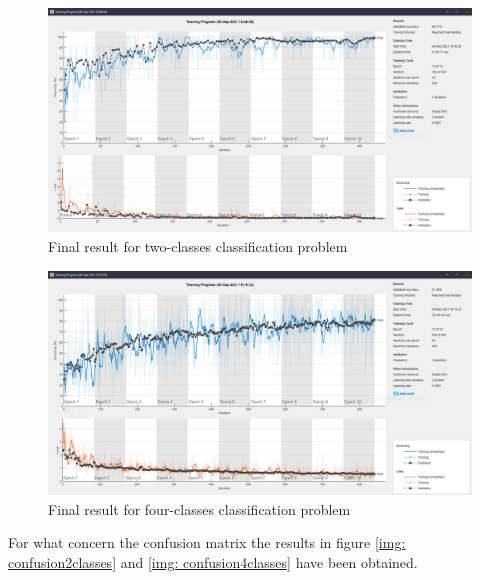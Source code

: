 \documentclass[a4paper]{report}
\begin{document}
	\begin{figure}[htbp]
		\centering
		\includegraphics[scale=0.31]{img/trainingCnnTwoClassesFinalResult.png}
		\caption{Final result for two-classes classification problem}
		\label{img: trainingCnnTwoClassesFinalResult}
	\end{figure}

	\begin{figure}[htbp]
		\centering
		\includegraphics[scale=0.31]{img/trainingCnnFourClassesFinalResult.png}
		\caption{Final result for four-classes classification problem}
		\label{img: trainingCnnFourClassesFinalResult}
	\end{figure}
	\noindent For what concern the confusion matrix the results in figure \ref{img: confusion2classes} and \ref{img: confusion4classes} have been obtained.
	
\end{document}
